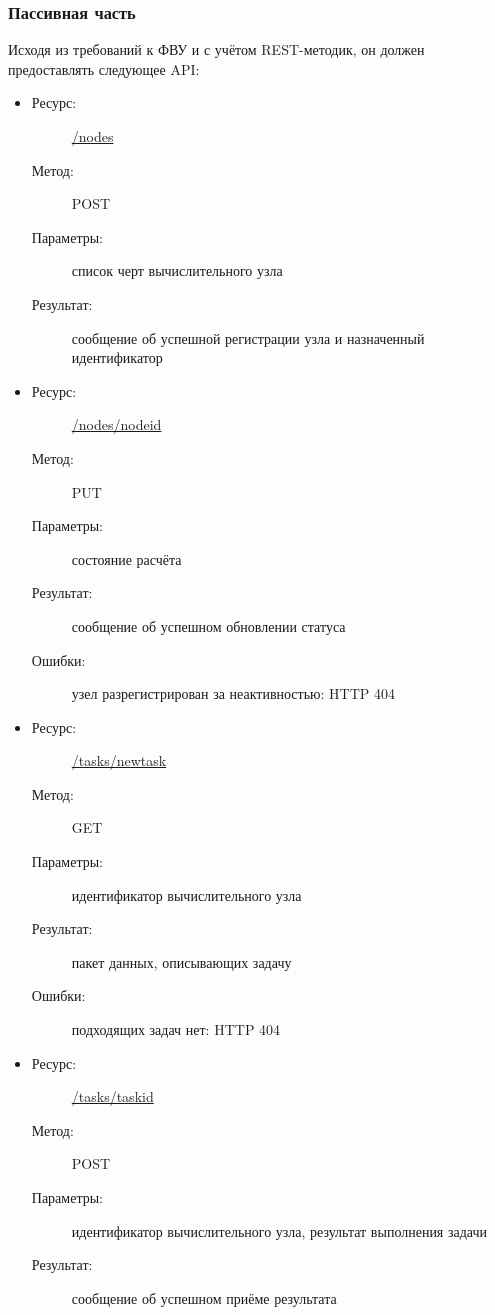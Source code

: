 \documentclass[a4paper,12pt]{report}
\numberwithin{equation}{section}
\begin{document}
\subsubsection{Пассивная часть}
Исходя из требований к ФВУ и с учётом REST-методик, он должен предоставлять следующее API:

\begin{itemize}
  \item
  \begin{description}
    \item[Ресурс:] \url{/nodes}
    \item[Метод:] POST
    \item[Параметры:] список черт вычислительного узла
    \item[Результат:] сообщение об успешной регистрации узла и назначенный идентификатор
  \end{description}
  \item
  \begin{description}
    \item[Ресурс:] \url{/nodes/nodeid}
    \item[Метод:] PUT
    \item[Параметры:] состояние расчёта
    \item[Результат:] сообщение об успешном обновлении статуса
    \item[Ошибки:] узел разрегистрирован за неактивностью: HTTP 404
  \end{description}
  \item
  \begin{description}
    \item[Ресурс:] \url{/tasks/newtask}
    \item[Метод:] GET
    \item[Параметры:] идентификатор вычислительного узла
    \item[Результат:] пакет данных, описывающих задачу
    \item[Ошибки:] подходящих задач нет: HTTP 404
  \end{description}
  \item
  \begin{description}
    \item[Ресурс:] \url{/tasks/taskid}
    \item[Метод:] POST
    \item[Параметры:] идентификатор вычислительного узла, результат выполнения задачи
    \item[Результат:] сообщение об успешном приёме результата
  \end{description}
\end{itemize}
  
\end{document}
